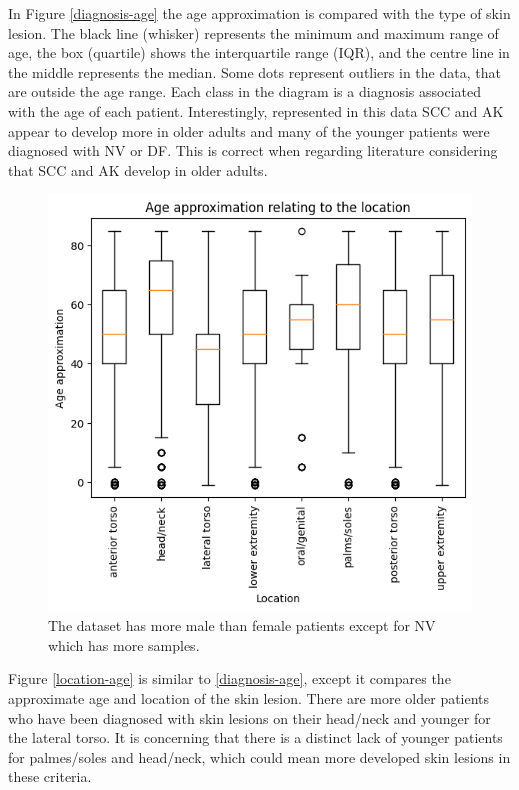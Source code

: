 In Figure \ref{diagnosis-age} the age approximation is compared with the type of skin lesion. The black line (whisker) represents the minimum and maximum range of age, the box (quartile) shows the interquartile range (IQR), and the centre line in the middle represents the median. Some dots represent outliers in the data, that are outside the age range. Each class in the diagram is a diagnosis associated with the age of each patient. Interestingly, represented in this data SCC and AK appear to develop more in older adults and many of the younger patients were diagnosed with NV or DF. This is correct when regarding literature considering that SCC and AK develop in older adults\cite{}.

\begin{figure}
	\centering
	\includegraphics[scale=0.8]{images/ISIC/location-age.png}
	\caption{The dataset has more male than female patients except for NV which has more samples.} 
\end{figure} \label{location-age}

Figure \ref{location-age} is similar to \ref{diagnosis-age}, except it compares the approximate age and location of the skin lesion. There are more older patients who have been diagnosed with skin lesions on their head/neck and younger for the lateral torso. It is concerning that there is a distinct lack of younger patients for palmes/soles and head/neck, which could mean more developed skin lesions in these criteria.

